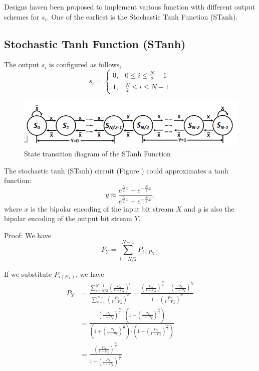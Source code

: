Designs haven been proposed to implement various function with different output schemes for $s_i$. One of the earliest is the Stochastic Tanh Function (STanh). 

\subsection{Stochastic Tanh Function (STanh)}



The output $s_i$ is configured as follows,
$$
s_i= \begin{cases}0, & 0 \leq i \leq \frac{N}{2}-1 \\ 1, & \frac{N}{2} \leq i \leq N-1\end{cases}
$$

\begin{figure}[htb]
	\includegraphics[width=12cm]{gfx/tanhlsm.png}
	\caption{State transition diagram of the STanh Function}
	\label{fig:system:example1}
\end{figure}

The stochastic tanh (STanh) circuit (Figure ) could approximates a tanh function:
$$
y \approx \frac{e^{\frac{N}{2} x}-e^{-\frac{N}{2} x}}{e^{\frac{N}{2} x}+e^{-\frac{N}{2} x}},
$$
where $x$ is the bipolar encoding of the input bit stream $X$ and $y$ is also the bipolar encoding of the output bit stream $Y$. 

Proof: We have
$$
P_Y=\sum_{i=N / 2}^{N-1} P_{i\left(P_X\right)}
$$

If we substitute $P_{i\left(P_X\right)}$, we have
$$
\begin{aligned}
P_Y & =\frac{\sum_{i=N / 2}^{N-1}\left(\frac{P_X}{1-P_X}\right)^i}{\sum_{k=0}^{N-1}\left(\frac{P_X}{1-P_X}\right)^k}=\frac{\left(\frac{P_X}{1-P_X}\right)^{\frac{N}{2}}-\left(\frac{P_X}{1-P_X}\right)^N}{1-\left(\frac{P_X}{1-P_X}\right)^N} \\
& =\frac{\left(\frac{P_X}{1-P_X}\right)^{\frac{N}{2}} \cdot\left(1-\left(\frac{P_X}{1-P_X}\right)^{\frac{N}{2}}\right)}{\left(1+\left(\frac{P_X}{1-P_X}\right)^{\frac{N}{2}}\right) \cdot\left(1-\left(\frac{P_X}{1-P_X}\right)^{\frac{N}{2}}\right)} \\
& =\frac{\left(\frac{P_X}{1-P_X}\right)^{\frac{N}{2}}}{1+\left(\frac{P_X}{1-P_X}\right)^{\frac{N}{2}}} .
\end{aligned}
$$

